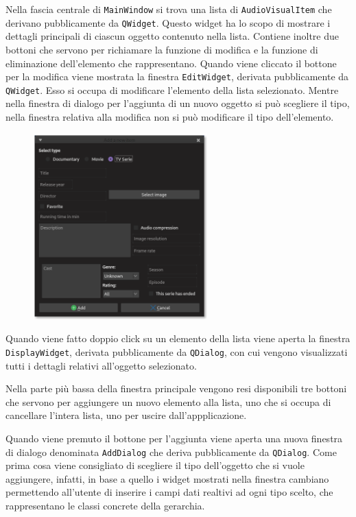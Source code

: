 Nella fascia centrale di \texttt{MainWindow} si trova una lista di \texttt{AudioVisualItem} che derivano pubblicamente da \texttt{QWidget}. Questo widget ha lo scopo di mostrare i dettagli principali di ciascun oggetto contenuto nella lista. \newline
Contiene inoltre due bottoni che servono per richiamare la funzione di modifica e la funzione di eliminazione dell'elemento che rappresentano. \newline
Quando viene cliccato il bottone per la modifica viene mostrata la finestra \texttt{EditWidget}, derivata pubblicamente da \texttt{QWidget}. Esso si occupa di modificare l'elemento della lista selezionato. \newline 
Mentre nella finestra di dialogo per l'aggiunta di un nuovo oggetto si può scegliere il tipo, nella finestra relativa alla modifica non si può modificare il tipo dell'elemento.
\begin{figure}
    \includegraphics[width=0.6\textwidth]{img/add} 
\end{figure}
Quando viene fatto doppio click su un elemento della lista viene aperta la finestra \texttt{DisplayWidget}, derivata pubblicamente da \texttt{QDialog}, con cui vengono visualizzati tutti i dettagli relativi all'oggetto selezionato. \newline

Nella parte più bassa della finestra principale vengono resi disponibili tre bottoni che servono per aggiungere un nuovo elemento alla lista, uno che si occupa di cancellare l'intera lista, uno per uscire dall'appplicazione. \newline 

Quando viene premuto il bottone per l'aggiunta viene aperta una nuova finestra di dialogo denominata \texttt{AddDialog} che deriva pubblicamente da \texttt{QDialog}. \newline
Come prima cosa viene consigliato di scegliere il tipo dell'oggetto che si vuole aggiungere, infatti, in base a quello i widget mostrati nella finestra cambiano permettendo all'utente di inserire i campi dati realtivi ad ogni tipo scelto, che rappresentano le classi concrete della gerarchia. \newline 
